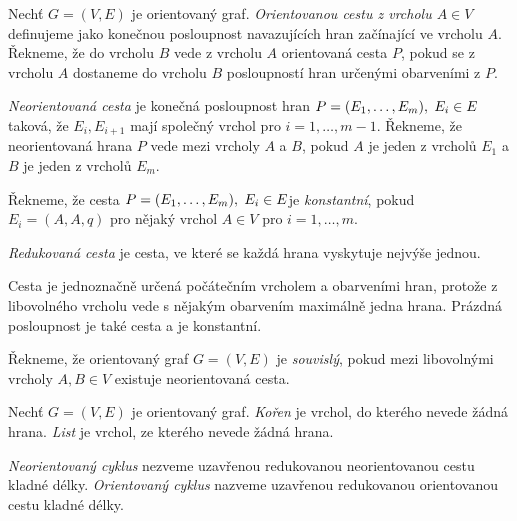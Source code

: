 \begin{definice}
    Nechť $G = (V, E)$ je orientovaný graf. 
    \emph{Orientovanou cestu z vrcholu $A \in V$} definujeme jako konečnou posloupnost navazujících hran začínající ve vrcholu $A$. Řekneme, že do vrcholu $B$ vede z vrcholu $A$ orientovaná cesta $P$, pokud se z vrcholu $A$ dostaneme do vrcholu $B$ posloupností hran určenými obarveními z $P$.

    \emph{Neorientovaná cesta} je konečná posloupnost hran $P = (E_1, \dots, E_m) , \hspace{3px} E_i\in E$ taková, že $E_i, E_{i+1}$ mají společný vrchol pro $i = 1,\dots,m-1$. Řekneme, že neorientovaná hrana $P$ vede mezi vrcholy $A$ a $B$, pokud $A$ je jeden z vrcholů $E_1$ a $B$ je jeden z vrcholů $E_m$.

    Řekneme, že cesta $P = (E_1, \dots, E_m) , \hspace{3px} E_i\in E$je \emph{konstantní}, pokud $E_i = (A,A,q)$ pro nějaký vrchol $A \in V$ pro $i = 1,\dots,m $. 

    \emph{Redukovaná cesta} je cesta, ve které se každá hrana vyskytuje nejvýše jednou.
\end{definice}
\begin{pozn}
    Cesta je jednoznačně určená počátečním vrcholem a obarveními hran, protože z libovolného vrcholu vede s nějakým obarvením maximálně jedna hrana. Prázdná posloupnost je také cesta a je konstantní.
\end{pozn}

\begin{definice}
    Řekneme, že orientovaný graf $G=(V,E)$ je \emph{souvislý}, pokud mezi libovolnými vrcholy $A, B \in V$ existuje neorientovaná cesta.
\end{definice}

\begin{definice}
    Nechť $G = (V, E)$ je orientovaný graf. \emph{Kořen} je vrchol, do kterého nevede žádná hrana. \emph{List} je vrchol, ze kterého nevede žádná hrana.
\end{definice}

\begin{definice}[Cyklus]
    \emph{Neorientovaný cyklus} nezveme uzavřenou redukovanou neorientovanou cestu kladné délky.
    \emph{Orientovaný cyklus} nazveme uzavřenou redukovanou orientovanou cestu kladné délky.
\end{definice}

